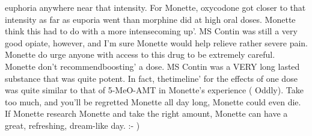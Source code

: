 \documentclass[12pt]{book}
\begin{document}
euphoria anywhere near that intensity. For Monette, oxycodone got closer to that intensity as far as euporia went than morphine did at high oral doses. Monette think this had to do with a more intensecoming up'. MS Contin was still a very good opiate, however, and I'm sure Monette would help relieve rather severe pain. Monette do urge anyone with access to this drug to be extremely careful. Monette don't recommendboosting' a dose. MS Contin was a VERY long lasted substance that was quite potent. In fact, thetimeline' for the effects of one dose was quite similar to that of 5-MeO-AMT in Monette's experience ( Oddly). Take too much, and you'll be regretted Monette all day long, Monette could even die. If Monette research Monette and take the right amount, Monette can have a great, refreshing, dream-like day. :- )
\end{document}
